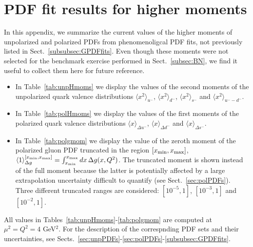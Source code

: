 \section{PDF fit results for higher moments }
\label{app:Hmoms}

In this appendix, we summarize the current values of the higher moments of 
unpolarized and polarized PDFs from phenomenoligcal PDF fits, not previously 
listed in Sect.~\ref{subsubsec:GPDFfits}.
%
Even though these moments were not selected for the benchmark exercise 
performed in Sect.~\ref{subsec:BN}, we find it useful to collect them 
here for future reference.

\begin{itemize}

\item In Table~\ref{tab:unpHmoms} we display the values of the second moments 
of the unpolarized quark valence distributions $\langle x^2\rangle_{u^-}$, 
$\langle x^2\rangle_{d^-}$, $\langle x^2\rangle_{s^-}$ and 
$\langle x^2\rangle_{u^--d^-}$.

\item In Table~\ref{tab:polHmoms} we display the values of the first moments 
of the polarized quark valence distributions $\langle x\rangle_{\Delta u^-}$, 
$\langle x\rangle_{\Delta d^-}$ and $\langle x\rangle_{\Delta s^-}$.

\item In Table~\ref{tab:polgmom} we display the value of the zeroth moment
of the polarized gluon PDF truncated in the region $[x_{\rm min}, x_{\rm max}]$,
$\langle 1\rangle_{\Delta g}^{[x_{\rm min}, x_{\rm max}]}=\int_{x_{\rm min}}^{x_{\rm max}}dx\,\Delta g(x,Q^2)$.
%
The truncated moment is shown instead of the full moment
because the latter is potentially affected by a large extrapolation 
uncertainty difficult to quantify (see Sect.~\ref{sec:polPDFs}). 
%
Three different truncated ranges are considered: $[10^{-5},1]$,  $[10^{-3},1]$
and  $[10^{-2},1]$.

\end{itemize}
%
All values in Tables~\ref{tab:unpHmoms}-\ref{tab:polgmom} are computed at 
$\mu^2=Q^2=4$ GeV$^2$.
%
For the description of the correspnding PDF sets and their uncertainties, see
Sects.~\ref{sec:unpPDFs}-\ref{sec:polPDFs}-\ref{subsubsec:GPDFfits}.

